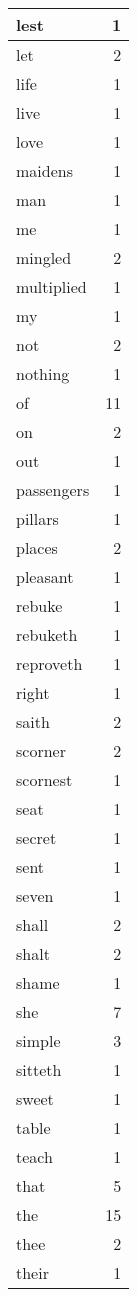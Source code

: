 \begin{center}
\begin{longtable}{l|r}
lest & 1\\ \hline 
let & 2\\ \hline 
life & 1\\ \hline 
live & 1\\ \hline 
love & 1\\ \hline 
maidens & 1\\ \hline 
man & 1\\ \hline 
me & 1\\ \hline 
mingled & 2\\ \hline 
multiplied & 1\\ \hline 
my & 1\\ \hline 
not & 2\\ \hline 
nothing & 1\\ \hline 
of & 11\\ \hline 
on & 2\\ \hline 
out & 1\\ \hline 
passengers & 1\\ \hline 
pillars & 1\\ \hline 
places & 2\\ \hline 
pleasant & 1\\ \hline 
rebuke & 1\\ \hline 
rebuketh & 1\\ \hline 
reproveth & 1\\ \hline 
right & 1\\ \hline 
saith & 2\\ \hline 
scorner & 2\\ \hline 
scornest & 1\\ \hline 
seat & 1\\ \hline 
secret & 1\\ \hline 
sent & 1\\ \hline 
seven & 1\\ \hline 
shall & 2\\ \hline 
shalt & 2\\ \hline 
shame & 1\\ \hline 
she & 7\\ \hline 
simple & 3\\ \hline 
sitteth & 1\\ \hline 
sweet & 1\\ \hline 
table & 1\\ \hline 
teach & 1\\ \hline 
that & 5\\ \hline 
the & 15\\ \hline 
thee & 2\\ \hline 
their & 1\\ \hline 

\end{longtable}
\end{center}
